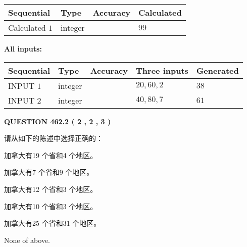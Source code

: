 \documentclass{ctexart}
\begin{document}
   
   
   
\noindent{}
   
   
  
  
\noindent\begin{tabular}{|l|l|l|l|}
\hline
 Sequential & Type & Accuracy & Calculated \\ 
\hline
 
 
  Calculated $  1 $ & integer &  & 
  $ 99 $ 
 \\  \hline  
 \end{tabular}
   
   
   
   
\noindent\vspace{0.1in}\hspace{-0.08in} {\textbf{\Large{All inputs: }}}
   
   
  
  
\noindent\begin{tabular}{|l|l|l|l|l|}
\hline
 Sequential & Type & Accuracy & Three inputs & Generated \\ 
\hline
 
 
  INPUT $  1 $ & integer &  & $
 20
 , 
 60
 , 
 2
 $ & $ 38 $ 
 \\  \hline  
 
 
  INPUT $  2 $ & integer &  & $
 40
 , 
 80
 , 
 7
 $ & $ 61 $ 
 \\  \hline  
 \end{tabular}
   
   
  
\vspace{0.2in}
  
{\textbf{\Large{QUESTION
462.2 
 ( 2 , 2 , 3 )
}}}
  
  
请从如下的陈述中选择正确的：
 
 
加拿大有19 个省和4 个地区。
 
 
加拿大有7 个省和9 个地区。
 
 
加拿大有12 个省和3 个地区。
 
 
加拿大有10 个省和3 个地区。
 
 
加拿大有25 个省和31 个地区。
 
 
 None of above.
 
 
\noindent{}
 
\end{document}
